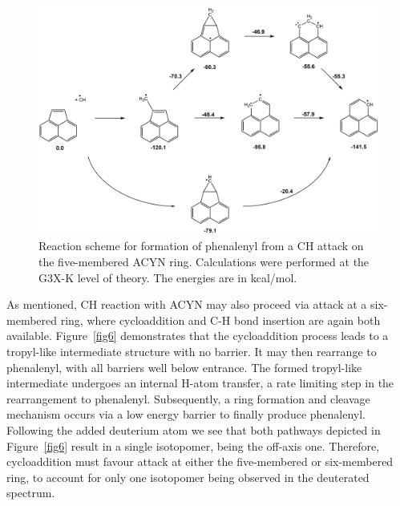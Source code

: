 \documentclass[journal=jacsat,manuscript=article,layout=onecolumn]{achemso}
\begin{document}
\begin{figure}[h!]
	\includegraphics[width=1\textwidth]{Figures/Figure5}
	\caption{Reaction scheme for formation of phenalenyl from a CH attack on the five-membered ACYN ring. Calculations were performed at the G3X-K level of theory. The energies are in kcal/mol.}
	\label{fig5}
\end{figure}

As mentioned, CH reaction with ACYN may also proceed via attack at a six-membered ring, where cycloaddition and C-H bond insertion are again both available. Figure~\ref{fig6} demonstrates that the cycloaddition process leads to a tropyl-like intermediate structure with no barrier. It may then rearrange to phenalenyl, with all barriers well below entrance. The formed tropyl-like intermediate undergoes an internal H-atom transfer, a rate limiting step in the rearrangement to phenalenyl. Subsequently, a ring formation and cleavage mechanism occurs via a low energy barrier to finally produce phenalenyl. Following the added deuterium atom we see that both pathways depicted in Figure~\ref{fig6} result in a single isotopomer, being the off-axis one. Therefore, cycloaddition must favour attack at either the five-membered or six-membered ring, to account for only one isotopomer being observed in the deuterated spectrum.
\end{document}
